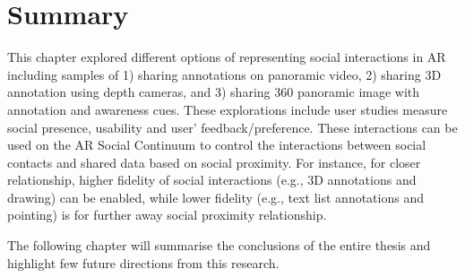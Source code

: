 \section{Summary}

This chapter explored different options of representing social interactions in AR including samples of 1) sharing annotations on panoramic video, 2) sharing 3D annotation using depth cameras, and 3) sharing 360 panoramic image with annotation and awareness cues. These explorations include user studies measure social presence, usability and user' feedback/preference. These interactions can be used on the AR Social Continuum to control the interactions between social contacts and shared data based on social proximity. For instance, for closer relationship, higher fidelity of social interactions (e.g., 3D annotations and drawing) can be enabled, while lower fidelity (e.g., text list annotations and pointing) is for further away social proximity relationship.

The following chapter will summarise the conclusions of the entire thesis and highlight few future directions from this research.
